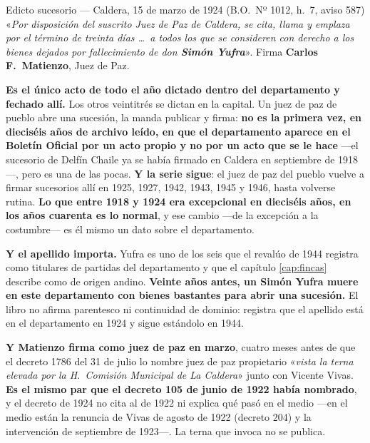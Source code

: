 \begin{ficha}{Edicto sucesorio --- Caldera, 15 de marzo de 1924 (B.O.\ Nº 1012, h.\ 7, aviso 587)}
«\textit{Por disposición del suscrito Juez de Paz de Caldera, se cita, llama y emplaza por el
término de treinta días \ldots\ a todos los que se consideren con derecho a los bienes dejados
por fallecimiento de don \textbf{Simón Yufra}}». Firma \textbf{Carlos F.\ Matienzo},
Juez de Paz.
\end{ficha}

\begin{cautela}
\textbf{Es el único acto de todo el año dictado dentro del departamento y fechado allí.} Los
otros veintitrés se dictan en la capital. Un juez de paz de pueblo abre una sucesión, la manda
publicar y firma: \textbf{no es la primera vez, en dieciséis años de archivo leído, en que el
departamento aparece en el Boletín Oficial por un acto propio y no por un acto que se le hace} ---el sucesorio de Delfín Chaile ya se había firmado en Caldera en septiembre de 1918---, pero es una de las pocas.
\textbf{Y la serie sigue}: el juez de paz del pueblo vuelve a firmar sucesorios
allí en 1925, 1927, 1942, 1943, 1945 y 1946, hasta volverse rutina. \textbf{Lo que entre 1918 y 1924 era excepcional
en dieciséis años, en los años cuarenta es lo normal}, y ese cambio ---de la excepción a la
costumbre--- es él mismo un dato sobre el departamento.

\textbf{Y el apellido importa.} Yufra es uno de los seis que el revalúo de 1944 registra como
titulares de partidas del departamento y que el capítulo \ref{cap:fincas} describe como de origen
andino. \textbf{Veinte años antes, un Simón Yufra muere en este departamento con bienes bastantes
para abrir una sucesión.} El libro no afirma parentesco ni continuidad de dominio: registra que
el apellido está en el departamento en 1924 y sigue estándolo en 1944.

\textbf{Y Matienzo firma como juez de paz en marzo}, cuatro meses antes de que el decreto 1786
del 31 de julio lo nombre juez de paz propietario «\textit{vista la terna elevada por la
H.\ Comisión Municipal de La Caldera}» junto con Vicente Vivas. \textbf{Es el mismo par que el
decreto 105 de junio de 1922 había nombrado}, y el decreto de 1924 no cita al de 1922 ni explica
qué pasó en el medio ---en el medio están la renuncia de Vivas de agosto de 1922 (decreto 204) y la
intervención de septiembre de 1923---. La terna que
invoca no se publica.
\end{cautela}

